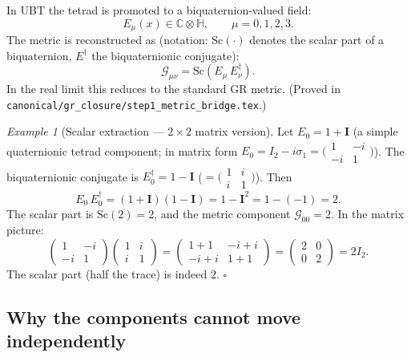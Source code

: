 \documentclass[12pt,a4paper]{article}
\theoremstyle{definition}
\theoremstyle{remark}
\newtheorem{example}[theorem]{Example}
\begin{document}
In UBT the tetrad is promoted to a biquaternion-valued field:
\begin{equation}
  E_\mu(x) \in \mathbb{C}\otimes\mathbb{H},
  \qquad \mu = 0,1,2,3.
\end{equation}
The metric is reconstructed as (notation: $\mathrm{Sc}(\cdot)$ denotes the
scalar part of a biquaternion, $E^\dagger$ the biquaternionic conjugate):
\begin{equation}
  \label{eq:ubt_metric}
  \mathcal{G}_{\mu\nu} = \mathrm{Sc}(E_\mu\,E_\nu^\dagger).
\end{equation}
In the real limit this reduces to the standard GR metric.
(Proved in \texttt{canonical/gr\_closure/\allowbreak step1\_metric\_bridge.tex}.)

\begin{example}[Scalar extraction — $2\times 2$ matrix version]
  \label{ex:tetrad_scalar}
  Let $E_0 = 1 + \mathbf{I}$ (a simple quaternionic tetrad component; in
  matrix form $E_0 = I_2 - i\sigma_1 = \bigl(\begin{smallmatrix}1&-i\\-i&1\end{smallmatrix}\bigr)$).
  The biquaternionic conjugate is $E_0^\dagger = 1 - \mathbf{I}$
  ($= \bigl(\begin{smallmatrix}1&i\\i&1\end{smallmatrix}\bigr)$).
  Then
  \[
    E_0\,E_0^\dagger
    = (1+\mathbf{I})(1-\mathbf{I})
    = 1 - \mathbf{I}^2 = 1 - (-1) = 2.
  \]
  The scalar part is $\mathrm{Sc}(2) = 2$, and the metric component
  $\mathcal{G}_{00} = 2$.  In the matrix picture:
  \[
    \begin{pmatrix}1&-i\\-i&1\end{pmatrix}
    \begin{pmatrix}1&i\\i&1\end{pmatrix}
    = \begin{pmatrix}1+1&-i+i\\-i+i&1+1\end{pmatrix}
    = \begin{pmatrix}2&0\\0&2\end{pmatrix}
    = 2I_2.
  \]
  The scalar part (half the trace) is indeed $2$.  \hfill$\square$
\end{example}

\subsection{Why the components cannot move independently}
\end{document}
